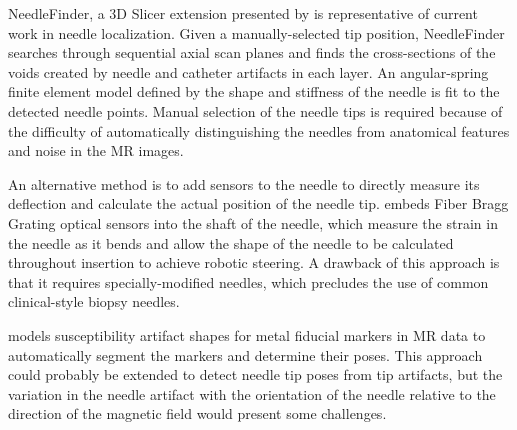NeedleFinder, a 3D Slicer extension presented by \cite{pernelle_validation_2013} is representative of current work in needle localization. Given a manually-selected tip position, NeedleFinder searches through sequential axial scan planes and finds the cross-sections of the voids created by needle and catheter artifacts in each layer. An angular-spring finite element model defined by the shape and stiffness of the needle is fit to the detected needle points. Manual selection of the needle tips is required because of the difficulty of automatically distinguishing the needles from anatomical features and noise in the MR images.

An alternative method is to add sensors to the needle to directly measure its deflection and calculate the actual position of the needle tip. \cite{abayazid_integrating_2013} embeds Fiber Bragg Grating optical sensors into the shaft of the needle, which measure the strain in the needle as it bends and allow the shape of the needle to be calculated throughout insertion to achieve robotic steering. A drawback of this approach is that it requires specially-modified needles, which precludes the use of common clinical-style biopsy needles.

\cite{zijlstra_fast_2017} models susceptibility artifact shapes for metal fiducial markers in MR data to automatically segment the markers and determine their poses. This approach could probably be extended to detect needle tip poses from tip artifacts, but the variation in the needle artifact with the orientation of the needle relative to the direction of the magnetic field would present some challenges.




